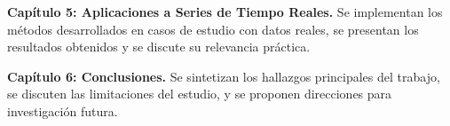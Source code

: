 \textbf{Capítulo 5: Aplicaciones a Series de Tiempo Reales.} Se implementan los métodos desarrollados en casos de estudio con datos reales, se presentan los resultados obtenidos y se discute su relevancia práctica.

\textbf{Capítulo 6: Conclusiones.} Se sintetizan los hallazgos principales del trabajo, se discuten las limitaciones del estudio, y se proponen direcciones para investigación futura.